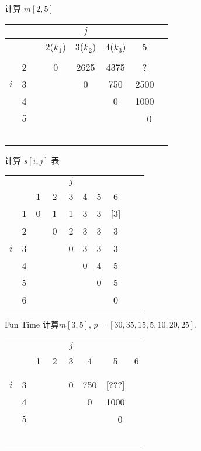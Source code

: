 \documentclass[fontset=fandol,UTF8,fleqn]{beamer}
\begin{document}
\begin{frame}{计算 $m[2,5]$}
\begin{table}
  \centering
\large{
  \begin{tabular}{lcc|c|c|c|c|c}
\hline
& & & & $j$ & & & \\    
\hline
&  &  & 2($k_1$) & 3($k_2$) & 4($k_3$) & 5 & \\
\hline
&  &  &  &  &  &   & \\
\hline
& 2 & & 0 & 2625 & 4375 & [?] & \\
\hline
$i$ & 3 & & & 0 & 750 & 2500 & \\
\hline
& 4 & & & & 0 & 1000 &  \\
\hline
& 5 &  &  & & &　0 & \\
\hline
&  & &　& & & & \\
\hline
  \end{tabular}
}
\end{table}
\end{frame}

\begin{frame}{计算 $s[i,j]$ 表}
\begin{table}
  \centering
\large{
  \begin{tabular}{lcccccccc}
& & & & $j$ & & & \\    
&  & 1 & 2 & 3 & 4 & 5 & 6 & \\
\hline
& 1 & 0 & 1 & 1 & 3 & 3  & [3] & \\
& 2 & & 0 & 2 & 3 & 3 & 3 &　\\
$i$ & 3 & & & 0 & 3 & 3 & 3 &　\\
& 4 & & & & 0 & 4 & 5 & \\
& 5 &  &  & & & 0 & 5 & \\
& 6 & &　& & & & 0 & \\
\hline
  \end{tabular}
}
\end{table}
\end{frame}

\begin{frame}{Fun Time}
计算$m[3,5]$, $p=[30, 35, 15, 5, 10, 20, 25]$.

\begin{table}
  \centering
  \begin{tabular}{lccccccc}
& & & & $j$ & & & \\    
&  & 1 & 2 & 3 & 4 & 5 & 6\\
\hline
&  &  &  &  &  &   & \\
&  & &  &  &  &  & \\
$i$ & 3 & & & 0 & 750 & [???] & \\
& 4 & & & & 0 & 1000 &  \\
& 5 &  &  & & &　0 & \\
&  & &　& & & & \\
\hline
  \end{tabular}
\end{table}
\end{frame}
\end{document}
